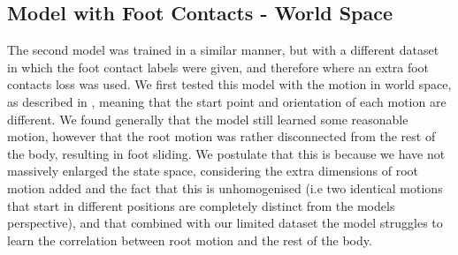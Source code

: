 \subsection{Model with Foot Contacts - World Space}
\label{sec:diffusion_contacts_world_space}

The second model was trained in a similar manner, but with a different dataset in which the foot contact labels were given, and therefore where an extra foot contacts loss was used. We first tested this model with the motion in world space, as described in , meaning that the start point and orientation of each motion are different. We found generally that the model still learned some reasonable motion, however that the root motion was rather disconnected from the rest of the body, resulting in foot sliding. We postulate that this is because we have not massively enlarged the state space, considering the extra dimensions of root motion added and the fact that this is unhomogenised (i.e two identical motions that start in different positions are completely distinct from the models perspective), and that combined with our limited dataset the model struggles to learn the correlation between root motion and the rest of the body.


